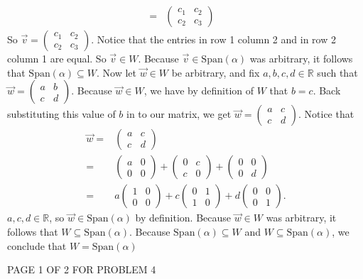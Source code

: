 \documentclass[12pt]{article}
\newenvironment{problem}[2][Problem]
{
	\begin{trivlist} 
		\item[\hskip \labelsep {\bfseries #1 #2:}]
	}
{
	\end{trivlist}
	}
\newenvironment{solution}[1][Solution]
{
	\begin{trivlist} 
		\item[\hskip \labelsep {\itshape #1:}]
	}
	{
	\end{trivlist}
}
\begin{document}
\begin{problem}{4}
\begin{solution}
\begin{align*}
=& \begin{pmatrix} c_1&c_2\\c_2&c_3 \end{pmatrix}&
\end{align*}
So $\vec{v} = \begin{pmatrix} c_1&c_2\\c_2&c_3 \end{pmatrix}$. Notice that the entries in row 1 column 2 and in row 2 column 1 are equal. So $\vec{v} \in W$. Because $\vec{v} \in \text{Span}(\alpha)$ was arbitrary, it follows that $\text{Span}(\alpha) \subseteq W$. Now let $\vec{w} \in W$ be arbitrary, and fix $a,b,c,d \in \mathbb{R}$ such that $\vec{w} = \begin{pmatrix} a&b\\c&d\end{pmatrix}$. Because $\vec{w} \in W$, we have by definition of $W$ that $b=c$. Back substituting this value of $b$ in to our matrix, we get $\vec{w} = \begin{pmatrix}a&c\\c&d \end{pmatrix}$. Notice that
\begin{align*}
\vec{w} =& \begin{pmatrix}a&c\\c&d \end{pmatrix} \\
=& \begin{pmatrix}a&0\\0&0 \end{pmatrix} + \begin{pmatrix}0&c\\c&0 \end{pmatrix} + \begin{pmatrix}0&0\\0&d \end{pmatrix} \\
=& a\begin{pmatrix}1&0\\0&0 \end{pmatrix} + c\begin{pmatrix}0&1\\1&0 \end{pmatrix} + d\begin{pmatrix}0&0\\0&1 \end{pmatrix} \text{.}
\end{align*}
$a,c,d \in \mathbb{R}$, so $\vec{w} \in \text{Span}(\alpha)$ by definition. Because $\vec{w} \in W$ was arbitrary, it follows that $W \subseteq \text{Span}(\alpha)$. Because $\text{Span}(\alpha) \subseteq W$ and $W \subseteq \text{Span}(\alpha)$, we conclude that $W = \text{Span}(\alpha)$
\end{solution}
\vfill
\centerline{PAGE 1 OF 2 FOR PROBLEM 4}
\end{problem}
\end{document}
